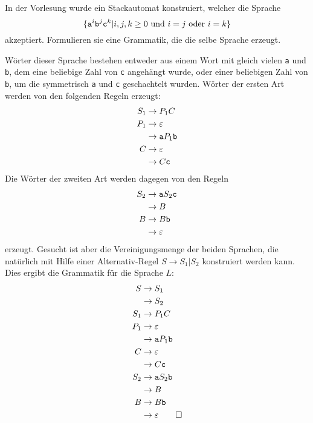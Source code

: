 In der Vorlesung wurde ein Stackautomat konstruiert, welcher die
Sprache
\[
\{{\tt a}^i{\tt b}^j{\tt c}^k|\text{$i,j,k\ge 0$ und $i=j$ oder $i=k$}\}
\]
akzeptiert.
Formulieren sie eine Grammatik, die die selbe Sprache erzeugt.


\begin{loesung}
Wörter dieser Sprache bestehen entweder aus einem Wort mit gleich
vielen {\tt a} und {\tt b}, dem eine beliebige Zahl von {\tt c}
angehängt wurde, oder einer beliebigen Zahl von {\tt b}, um die
symmetrisch {\tt a} und {\tt c} geschachtelt wurden.
Wörter der ersten Art werden von den folgenden Regeln erzeugt:
\begin{align*}
S_1&\to P_1C\\
P_1&\to\varepsilon\\
   &\to {\tt a}P_1{\tt b}\\
C  &\to\varepsilon\\
   &\to C{\tt c}
\end{align*}
Die Wörter der zweiten Art werden dagegen von den Regeln
\begin{align*}
S_2&\to{\tt a}S_2{\tt c}\\
   &\to B\\
B  &\to B{\tt b}\\
   &\to\varepsilon
\end{align*}
erzeugt.
Gesucht ist aber die Vereinigungsmenge der beiden Sprachen, die
natürlich mit Hilfe einer Alternativ-Regel $S\to S_1|S_2$
konstruiert werden kann.
Dies ergibt die Grammatik für die Sprache $L$:
\begin{align*}
S  &\to S_1\\
   &\to S_2\\
S_1&\to P_1C\\
P_1&\to\varepsilon\\
   &\to {\tt a}P_1{\tt b}\\
C  &\to\varepsilon\\
   &\to C{\tt c}\\
S_2&\to{\tt a}S_2{\tt b}\\
   &\to B\\
B  &\to B{\tt b}\\
   &\to\varepsilon
\qedhere
\end{align*}
\end{loesung}
